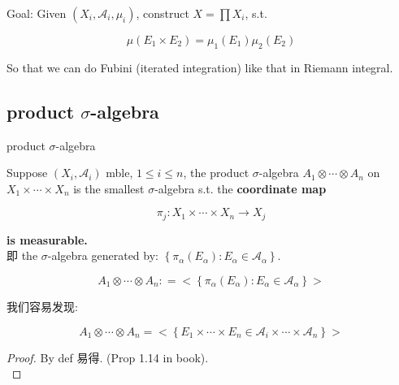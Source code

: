 \documentclass{qlnotes-export}
\begin{document}
Goal: Given \((X_{i},\mathcal{A}_{i},\mu_{i})\), construct \(X = \prod X_{i}\), s.t.

\[\mu(E_{1} \times E_{2}) = \mu_{1}(E_{1})\mu_{2}(E_{2})\]

So that we can do Fubini (iterated integration) like that in Riemann integral.

\subsection{\texorpdfstring{product \(\sigma\)-algebra}{product \textbackslash sigma-algebra}}\label{product-sigma-algebra}

\begin{definition}{product \(\sigma\)-algebra}\label{def-06-product-measure-fubini-tonelli-product-sigma-algebra}

Suppose \((X_{i},\mathcal{A}_{i})\) mble, \(1 \leq i \leq n\), the product \(\sigma\)-algebra \(A_{1} \otimes \cdots \otimes A_{n}\) on \(X_{1} \times \cdots \times X_{n}\) is the smallest \(\sigma\)-algebra s.t. the \textbf{coordinate map}

\[\pi_{j}:X_{1} \times \cdots \times X_{n}\rightarrow X_{j}\]

\textbf{is measurable.}\\
即 the \(\sigma\)-algebra generated by: \(\left\{ {\pi_{\alpha}(E_{\alpha}):E_{\alpha} \in \mathcal{A}_{\alpha}} \right\}\).

\[A_{1} \otimes \cdots \otimes A_{n}: = < \left\{ {\pi_{\alpha}(E_{\alpha}):E_{\alpha} \in \mathcal{A}_{\alpha}} \right\} >\]

\end{definition}

我们容易发现:

\begin{proposition}\label{prop-06-product-measure-fubini-tonelli-proposition-001}

\[A_{1} \otimes \cdots \otimes A_{n} = < \left\{ {E_{1} \times \cdots \times E_{n} \in \mathcal{A}_{i} \times \cdots \times \mathcal{A}_{n}} \right\} >\]

\end{proposition}

\begin{proof}

By def 易得. (Prop 1.14 in book).\\

\end{proof}
\end{document}
